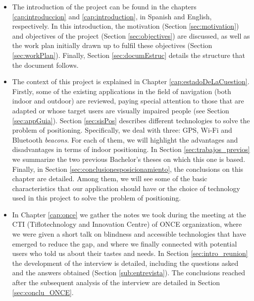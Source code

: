 \begin{itemize}
	
	\item The introduction of the project can be found in the chapters \ref{cap:introduccion} and \ref{cap:introduction}, in Spanish and English, respectively. In this introduction, the motivation (Section \ref{sec:motivation}) and objectives of the project (Section \ref{sec:objectives}) are discussed, as well as the work plan initially drawn up to fulfil these objectives (Section \ref{sec:workPlan}). Finally, Section \ref{sec:documEstruc} details the structure that the document follows.
	
	\item The context of this project is explained in Chapter \ref{cap:estadoDeLaCuestion}. Firstly, some of the existing applications in the field of navigation (both indoor and outdoor) are reviewed, paying special attention to those that are adapted or whose target users are visually impaired people (see Section \ref{sec:appGuia}). Section \ref{sec:sisPos} describes different technologies to solve the problem of positioning. Specifically, we deal with three: GPS, Wi-Fi and Bluetooth \textit{beacons}. For each of them, we will highlight the advantages and disadvantages in terms of indoor positioning. In Section \ref{sec:trabajos_previos} we summarize the two previous Bachelor's theses on which this one is based. Finally, in Section \ref{sec:conclusionesposicionamiento}, the conclusions on this chapter are detailed. Among them, we will see some of the basic characteristics that our application should have or the choice of technology used in this project to solve the problem of positioning. 
	
	\item In Chapter \ref{cap:once} we gather the notes we took during the meeting at the CTI (Tiflotechnology and Innovation Centre) of ONCE organization, where we were given a short talk on blindness and accessible technologies that have emerged to reduce the gap, and where we finally connected with potential users who told us about their tastes and needs. In Section \ref{sec:intro_reunion} the development of the interview is detailed, including the questions asked and the answers obtained (Section \ref{sub:entrevista}). The conclusions reached after the subsequent analysis of the interview are detailed in Section \ref{sec:conclu_ONCE}. 
	

\end{itemize}

